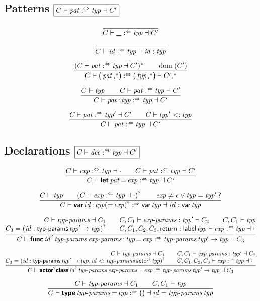 \subsection*{Patterns \hfill $\boxed{C \vdash \operatorname{\mathit{pat}} :^\Leftrightarrow \operatorname{\mathit{typ}} \dashv C'}$}

$$
\frac{
}{
  C \vdash \textsf{\sf\textbf{\textunderscore}} :^\Leftarrow \operatorname{\mathit{typ}} \dashv C'
}
$$

$$
\frac{
}{
  C \vdash \operatorname{\mathit{id}} :^\Leftarrow \operatorname{\mathit{typ}} \dashv \operatorname{\mathit{id}} : \operatorname{\mathit{typ}}
}
$$

$$
\frac{
  (C \vdash \x{pat} \analsynth \x{typ} \dashv C')^\ast
  \qquad
  \Dom(C')
}{
  C \vdash \K( \x{pat}\K,^\ast \K) \analsynth \K( \x{typ}\K,^\ast \K) \dashv C',^\ast
}
$$

$$
\frac{
  C \vdash \operatorname{\mathit{typ}}
  \qquad
  C \vdash \operatorname{\mathit{pat}} :^\Leftarrow \operatorname{\mathit{typ}} \dashv C'
}{
  C \vdash \operatorname{\mathit{pat}} \textsf{\sf:} \operatorname{\mathit{typ}} :^\Rightarrow \operatorname{\mathit{typ}} \dashv C'
}
$$

$$
\frac{
  C \vdash \operatorname{\mathit{pat}} :^\Rightarrow \operatorname{\mathit{typ}}' \dashv C'
  \qquad
  C \vdash \operatorname{\mathit{typ}}' <: \operatorname{\mathit{typ}}
}{
  C \vdash \operatorname{\mathit{pat}} :^\Leftarrow \operatorname{\mathit{typ}} \dashv C'
}
$$


\subsection*{Declarations \hfill $\boxed{C \vdash \operatorname{\mathit{dec}} :^\Leftrightarrow \operatorname{\mathit{typ}} \dashv C'}$}

$$
\frac{
  C \vdash \operatorname{\mathit{exp}} :^\Leftrightarrow \operatorname{\mathit{typ}} \dashv \cdot
  \qquad
  C \vdash \operatorname{\mathit{pat}} :^\Leftarrow \operatorname{\mathit{typ}} \dashv C'
}{
  C \vdash \textsf{\sf\textbf{let}} \operatorname{\mathit{pat}} \textsf{\sf=} \operatorname{\mathit{exp}} :^\Leftrightarrow \operatorname{\mathit{typ}} \dashv C'
}
$$

$$
\frac{
  C \vdash \operatorname{\mathit{typ}}
  \qquad
  (C \vdash \operatorname{\mathit{exp}} :^\Leftarrow \operatorname{\mathit{typ}} \dashv \cdot)^?
  \qquad
  \operatorname{\mathit{exp}} \neq \epsilon \vee \operatorname{\mathit{typ}} = \operatorname{\mathit{typ}}' \textsf{\sf?}
}{
  C \vdash \textsf{\sf\textbf{var}} \operatorname{\mathit{id}} \textsf{\sf:} \operatorname{\mathit{typ}} (\textsf{\sf=} \operatorname{\mathit{exp}})^? :^\Rightarrow \textsf{\sf var} \operatorname{\mathit{typ}} \dashv \operatorname{\mathit{id}} : \textsf{\sf var} \operatorname{\mathit{typ}}
}
$$

$$
\frac{
  \begin{array}{@{}r@{\qquad}l@{}}
  C \vdash \x{typ-params} \dashv C_1
  &
  C, C_1 \vdash \x{exp-params} : \x{typ}' \dashv C_2
  \qquad
  C, C_1 \vdash \x{typ}
  \\
  C_3 = (\x{id} : \K{typ-params} \x{typ}' \Kto \x{typ})^?
  &
  C, C_1, C_2, C_3, \K{return} : \K{label} \x{typ} \vdash \x{exp} \anal \x{typ} \dashv \cdot
  \end{array}
}{
  C \vdash \KK{func} \x{id}^? \x{typ-params} \x{exp-params} \K: \x{typ} \K= \x{exp} \synth \x{typ-params} \x{typ}' \Kto \x{typ} \dashv C_3
}
$$

$$
\frac{
  \begin{array}{@{}r@{\qquad}l@{}}
  C \vdash \x{typ-params} \dashv C_1
  &
  C, C_1 \vdash \x{exp-params} : \x{typ}' \dashv C_2
  \\
  C_3 = (\x{id} : \K{typ-params} \x{typ}' \Kto \x{typ}, \x{id} <: \x{typ-params} \K{actor}^? \x{typ})^?
  &
  C, C_1, C_2, C_3 \vdash \x{exp} \synth \x{typ} \dashv \cdot
  \end{array}
}{
  C \vdash \KK{actor}^? \KK{class} \x{id}^? \x{typ-params} \x{exp-params} \K= \x{exp} \synth \x{typ-params} \x{typ}' \Kto \x{typ} \dashv C_3
}
$$

$$
\frac{
  C \vdash \operatorname{\mathit{typ-params}} \dashv C_1
  \qquad
  C, C_1 \vdash \operatorname{\mathit{typ}}
}{
  C \vdash \textsf{\sf\textbf{type}} \operatorname{\mathit{typ-params}} \textsf{\sf=} \operatorname{\mathit{typ}} :^\Rightarrow \textsf{\sf()} \dashv \operatorname{\mathit{id}} = \operatorname{\mathit{typ-params}} \operatorname{\mathit{typ}}
}
$$
